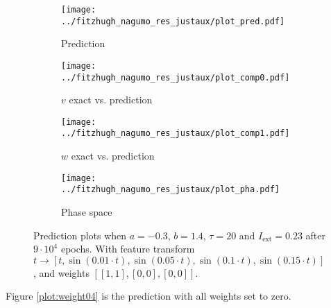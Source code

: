 \documentclass[a4paper]{article}
\begin{document}
\begin{figure}[H]
	\centering 
	\begin{subfigure}[b]{0.47\textwidth}
		\centering
		\texttt{[image: ../fitzhugh\_nagumo\_res\_justaux/plot\_pred.pdf]}
		\caption{Prediction}
		\label{fig:weight03a}
	\end{subfigure}
	\begin{subfigure}[b]{0.47\textwidth}
		\centering
		\texttt{[image: ../fitzhugh\_nagumo\_res\_justaux/plot\_comp0.pdf]}
		\caption{$v$ exact vs. prediction}
		\label{fig:weight03b}
	\end{subfigure}
	\begin{subfigure}[b]{0.47\textwidth}
		\centering
		\texttt{[image: ../fitzhugh\_nagumo\_res\_justaux/plot\_comp1.pdf]}
		\caption{$w$ exact vs. prediction}
		\label{fig:weight03c}
	\end{subfigure}
	\begin{subfigure}[b]{0.47\textwidth}
		\centering
		\texttt{[image: ../fitzhugh\_nagumo\_res\_justaux/plot\_pha.pdf]}
		\caption{Phase space}
		\label{fig:weight03d}
	\end{subfigure}
	\caption{Prediction plots when $a=-0.3$, $b=1.4$, $\tau=20$ and $ I_{\text{ext}}=0.23$ after $9\cdot10^4$ epochs. With feature transform $t \rightarrow \left[ t, \sin(0.01 \cdot  t), \sin(0.05 \cdot  t), \sin(0.1 \cdot  t), \sin(0.15 \cdot  t)\right] $, and weights $\left[ \left[ 1, 1\right], \left[ 0, 0\right], \left[ 0, 0\right]\right]$.}
	\label{plot:weight03}
\end{figure} 	

Figure \ref{plot:weight04} is the prediction with all weights set to zero.
\end{document}
